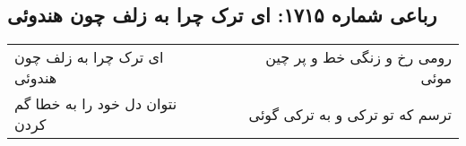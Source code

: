 \begin{center}
\section*{رباعی شماره ۱۷۱۵: ای ترک چرا به زلف چون هندوئی}
\label{sec:1715}
\begin{longtable}{l p{0.5cm} r}
ای ترک چرا به زلف چون هندوئی
&&
رومی رخ و زنگی خط و پر چین موئی
\\
نتوان دل خود را به خطا گم کردن
&&
ترسم که تو ترکی و به ترکی گوئی
\\
\end{longtable}
\end{center}
